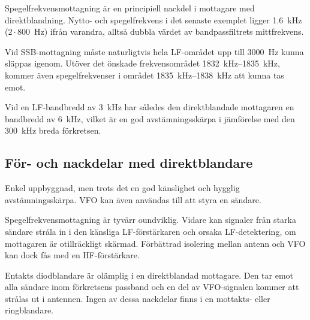 Spegelfrekvensmottagning är en principiell nackdel i mottagare med
direktblandning.
Nytto- och spegelfrekvens i det senaste exemplet ligger
\qty{1,6}{\kilo\hertz} ($2\cdot 800$~\unit{\hertz}) ifrån varandra, alltså dubbla värdet
av bandpassfiltrets mittfrekvens.

Vid SSB-mottagning måste naturligtvis hela LF-området upp till
\qty{3000}{\hertz} kunna släppas igenom.
Utöver det önskade frekvensområdet \SIrange{1832}{1835}{\kilo\hertz}, kommer
även spegelfrekvenser i området \SIrange{1835}{1838}{\kilo\hertz} att kunna tas
emot.

Vid en LF-bandbredd av \qty{3}{\kilo\hertz} har således den direktblandade
mottagaren en bandbredd av \qty{6}{\kilo\hertz}, vilket är en god
avstämningsskärpa i jämförelse med den \qty{300}{\kilo\hertz} breda förkretsen.

\subsection{För- och nackdelar med direkt\-blandare}

Enkel uppbyggnad, men trots det en god känslighet och hygglig avstämningsskärpa.
VFO kan även användas till att styra en sändare.

Spegelfrekvensmottagning är tyvärr oundviklig.
Vidare kan signaler från starka sändare stråla in i den känsliga LF-förstärkaren
och orsaka LF-detektering, om mottagaren är otillräckligt skärmad.
Förbättrad isolering mellan antenn och VFO kan dock fås med en HF-förstärkare.

Entakts diodblandare är olämplig i en direktblandad mottagare.
Den tar emot alla sändare inom förkretsens passband och en del av VFO-signalen
kommer att strålas ut i antennen.
Ingen av dessa nackdelar finns i en mottakts- eller ringblandare.
